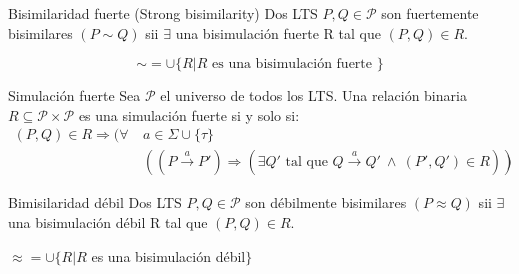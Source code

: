 \begin{definicion}{Bisimilaridad fuerte (Strong bisimilarity)}
Dos LTS $P,Q \in \mathcal{P}$ son fuertemente bisimilares $(P \sim Q)$ sii $\exists$ una bisimulación fuerte R tal que $(P,Q) \in R$.

$$\sim  = \cup \{R | R \text{ es una bisimulación fuerte }\}$$

\end{definicion}

\begin{definicion}{Simulación fuerte}
Sea $\mathcal{P}$ el universo de todos los LTS. Una relación binaria $R\subseteq \mathcal{P}\times \mathcal{P}$ es una simulación fuerte si y solo si:
\begin{align*}
(P,Q)\in R \Rightarrow (\forall~&a\in \Sigma\cup\{\tau\}
\\ &((P\overset{a}{\to} P') \Rightarrow (\exists Q' \text{ tal que } Q \overset{a}{\to} Q'~\land~(P',Q')\in R))
)
\end{align*} 
\end{definicion}


\begin{definicion}{Bimisilaridad débil}
Dos LTS $P,Q \in \mathcal{P}$ son débilmente bisimilares $(P \approx Q)$ sii $\exists$ una bisimulación débil R tal que $(P,Q) \in R$.

\begin{center}
$\approx = \cup \{R | R$ es una bisimulación débil$\}$
\end{center}
\end{definicion}
